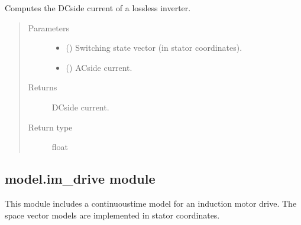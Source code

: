 \documentclass[letterpaper,10pt,english]{sphinxmanual}
\begin{document}
\begin{fulllineitems}
\label{\detokenize{model:model.converter.dc_current}}
\pysigstartsignatures
{}
\pysigstopsignatures
\sphinxAtStartPar
Computes the DC\sphinxhyphen{}side current of a lossless inverter.
\begin{quote}\begin{description}
\item[{Parameters}] \leavevmode\begin{itemize}
\item {} 
\sphinxAtStartPar
{} () \textendash{} Switching state vector (in stator coordinates).

\item {} 
\sphinxAtStartPar
{} () \textendash{} AC\sphinxhyphen{}side current.

\end{itemize}

\item[{Returns}] \leavevmode
\sphinxAtStartPar
{} \textendash{} DC\sphinxhyphen{}side current.

\item[{Return type}] \leavevmode
\sphinxAtStartPar
float

\end{description}\end{quote}

\end{fulllineitems}



\subsection{model.im\_drive module}
\label{\detokenize{model:module-model.im_drive}}\label{\detokenize{model:model-im-drive-module}}
\sphinxAtStartPar
This module includes a continuous\sphinxhyphen{}time model for an induction motor drive. The
space vector models are implemented in stator coordinates.
\end{document}
